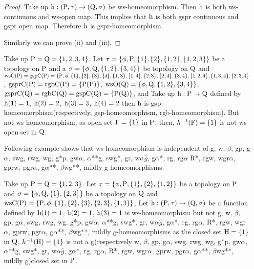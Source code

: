 \begin{proof}
Take up $\mathrm{h}: (\mathrm{P},\tau)\to (\mathrm{Q}, \sigma)$ be ws-homeomorphism. Then $\mathrm{h}$ is both ws-continuous and ws-open map. This implies that $\mathrm{h}$ is both gspr continuous and gspr open map. Therefore $\mathrm{h}$ is gspr-homeomorphism.

Similarly we can prove (ii) and (iii).
\end{proof}

\begin{exm}\label{exam5.2.5}
Take up $\mathrm{P}=\mathrm{Q}= \{1, 2, 3,4\}$. Let $\tau= \{\phi, \TSP, \{1\}, \{2\}, \{1, 2\},\break \{1,2,3\}\}$ be a topology on $\mathrm{P}$ and a $\sigma=\{\phi,\mathrm{Q},\{1,2\},\{3,4\}\}$ be topology on $\mathrm{Q}$ and $\ws\TSC(\TSP)=\gsp\TSC(\TSP)=\{\TSP,\phi,\{1\},\{2\},\{3\},\{4\},\{1,3\},\{1,4\},\{2,3\},\{2,4\},\{3,4\},\break \{1,2,4\},\{1,3,4\},\{2,3,4\}$, $\mathrm{gspr}\mathrm{C}(\mathrm{P})=\mathrm{rgb}\mathrm{C}(\mathrm{P})=\{\mathrm{P}(\mathrm{P})\}$, $\ws\TSO(\TSQ)=\{\phi,\TSQ,\{1,2\},\break \{3,4\}\}$, $\mathrm{gspr}\mathrm{C}(\mathrm{Q})=\mathrm{rgb}\mathrm{C}(\mathrm{Q})= \mathrm{gsp}\mathrm{C}(\mathrm{Q})=\{\mathrm{P}(\mathrm{Q})\}$, and Take up $\mathrm{h}: \mathrm{P}\to \mathrm{Q}$ defined by $\mathrm{h}(1)=1$, $\mathrm{h}(2)= 2$, $\mathrm{h}(3)=3$, $\mathrm{h}(4)=2$ then $\mathrm{h}$ is gsp-homeomorphism(respectively, gsp-homeomorphism, rgb-homeomorphism). But not ws-homeomorphism, as open set $\mathrm{F}= \{1\}$ in $\mathrm{P}$, then, $h^{-1} (\mathrm{F}) = \{1\}$ is not ws-open set in $\mathrm{Q}$.
\end{exm}

\begin{rem}\label{rem5.2.1}
Following example shows that ws-homeomorphism is independent of g, w, $\beta$, gp, g$\alpha$, swg, rwg, wg, g*p, gw$\alpha$, $\alpha${*}{*}g, swg*, gr, w$\alpha\hat{g}$, g$\alpha$*, rg, rg$\alpha$ R*, rgw, wgr$\alpha$, gprw, pgr$\alpha$, g$\alpha${*}{*}, $\beta$wg{*}{*}, mildly g-homeomorphisms.
\end{rem}

\begin{exm}\label{exam5.2.6}
Take up $\mathrm{P}=\mathrm{Q}= \{1, 2, 3\}$. Let $\tau= \{\phi, \mathrm{P}, \{1\}, \{2\}, \{1, 2\}\}$ be a topology on $\mathrm{P}$ and $\sigma=\{\phi, \mathrm{Q}, \{1\},\{2,3\}\}$ be a topology on $\mathrm{Q}$ and $\mathrm{ws}\mathrm{C}(\mathrm{P})=\{\mathrm{P}, \phi,\{1\}, \{2\}, \{3\},\{2,3\},\{1, 3\}\}$, Let $\mathrm{h}: (\mathrm{P}, \tau)\to (\mathrm{Q}, \sigma)$ be a function defined by $\mathrm{h}(1)=1$, $\mathrm{h}(2)= 1$, $\mathrm{h}(3)=1$ is ws-homeomorphism but not g, w, $\beta$, gp, g$\alpha$, swg, rwg, wg, g*p, gw$\alpha$, $\alpha${*}{*}g, swg*, gr, w$\alpha\hat{g}$, g$\alpha$*, rg, rg$\alpha$, R*, rgw, wgr$\alpha$, gprw, pgr$\alpha$, g$\alpha${*}{*}, $\beta$wg{*}{*}, mildly g-homeomorphisms as the closed set $\mathrm{H}=\{1\}$ in $\mathrm{Q}$, $h^{-1}(\mathrm{H})=\{1\}$ is not a g(respectively w, $\beta$, gp, g$\alpha$, swg, rwg, wg, g*p, gw$\alpha$, $\alpha${*}{*}g, swg*, gr, w$\alpha\hat{g}$, g$\alpha$*, rg, rg$\alpha$, R*, rgw, wgr$\alpha$, gprw, pgr$\alpha$, g$\alpha${*}{*}, $\beta$wg{*}{*}, mildly g)closed set in $\mathrm{P}$.
\end{exm}

